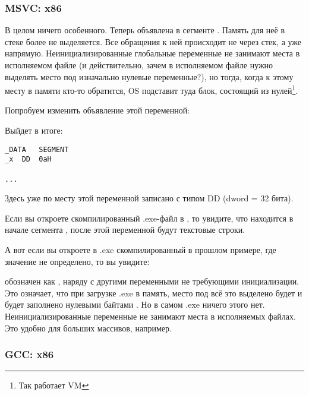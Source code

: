\subsubsection{MSVC: x86}



В целом ничего особенного. Теперь  объявлена в сегменте . 
Память для неё в стеке более не выделяется.
Все обращения к ней происходит не через стек, а уже напрямую. 
Неинициализированные глобальные переменные не занимают места в исполняемом файле
(и действительно, зачем в исполняемом файле
нужно выделять место под изначально нулевые переменные?), но тогда, когда к этому месту в памяти
кто-то обратится, \ac{OS} подставит туда блок, состоящий из нулей\footnote{Так работает \ac{VM}}.

Попробуем изменить объявление этой переменной:



Выйдет в итоге:

\begin{lstlisting}[style=customasmx86]
_DATA	SEGMENT
_x	DD	0aH

...
\end{lstlisting}

Здесь уже по месту этой переменной записано  с типом DD (dword = 32 бита).

Если вы откроете скомпилированный .exe-файл в \IDA, то увидите, что  
находится в начале сегмента , после этой переменной будут текстовые строки.

А вот если вы откроете в \IDA .exe скомпилированный в прошлом примере, где значение  не определено, то вы увидите:



 обозначен как , наряду с другими переменными не требующими инициализации. 
Это означает, что при загрузке .exe в память, место под всё это выделено будет и будет заполнено
нулевыми байтами .
Но в самом .exe ничего этого нет. Неинициализированные переменные не занимают места в исполняемых файлах. 
Это удобно для больших массивов, например.



\subsubsection{GCC: x86}

